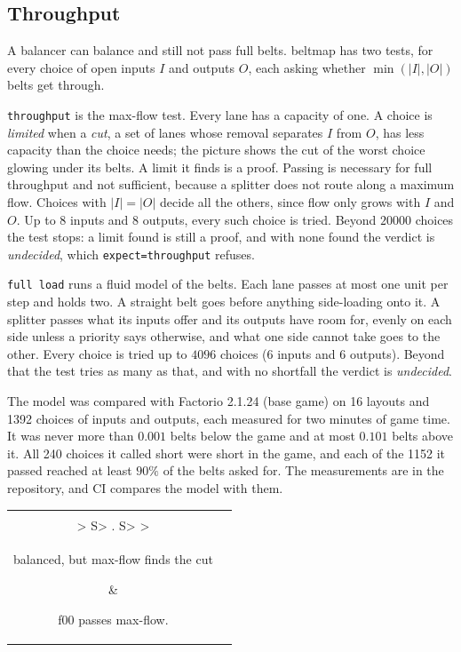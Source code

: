 \documentclass[11pt]{article}
\newcommand\key[1]{\texttt{#1}}
\newenvironment{pictures}[1]{\tagpdfsetup{table/tagging=presentation}\begin{tabular}{#1}}{\end{tabular}}
\begin{document}
	\subsection{Throughput}
	\label{sec:tp}

	A balancer can balance and still not pass full belts. \textsf{beltmap} has two tests, for every choice of open inputs $I$ and outputs $O$, each asking whether $\min(|I|, |O|)$ belts get through.

	\key{throughput} is the max-flow test. Every lane has a capacity of one. A choice is \emph{limited} when a \emph{cut}, a set of lanes whose removal separates $I$ from $O$, has less capacity than the choice needs; the picture shows the cut of the worst choice glowing under its belts. A limit it finds is a proof. Passing is necessary for full throughput and not sufficient, because a splitter does not route along a maximum flow. Choices with $|I| = |O|$ decide all the others, since flow only grows with $I$ and $O$. Up to $8$ inputs and $8$ outputs, every such choice is tried. Beyond $20000$ choices the test stops: a limit found is still a proof, and with none found the verdict is \emph{undecided}, which \key{expect=throughput} refuses.

	\key{full load} runs a fluid model of the belts. Each lane passes at most one unit per step and holds two. A straight belt goes before anything side-loading onto it. A splitter passes what its inputs offer and its outputs have room for, evenly on each side unless a priority says otherwise, and what one side cannot take goes to the other. Every choice is tried up to $4096$ choices ($6$ inputs and $6$ outputs). Beyond that the test tries as many as that, and with no shortfall the verdict is \emph{undecided}.

	The model was compared with Factorio 2.1.24 (base game) on 16 layouts and 1392 choices of inputs and outputs, each measured for two minutes of game time. It was never more than $0.001$ belts below the game and at most $0.101$ belts above it. All 240 choices it called short were short in the game, and each of the 1152 it passed reached at least $90\%$ of the belts asked for. The measurements are in the repository, and CI compares the model with them.

	\begin{center}
		\begin{pictures}{@{}c@{\qquad}c@{}}
			\begin{beltgrid}[mix, throughput, labels, tile=6mm, expect={balanced, limited, full-load-limited}]
				> S> > S> > \\
				> S> . S> >
			\end{beltgrid}
			&
			\beltlayout[full load, labels, tile=3.4mm, expect={throughput, full-load-limited}]{examples/f00_9x10.json} \\[2pt]
			\parbox[t]{0.42\linewidth}{\centering\small balanced, but max-flow finds the cut} &
			\parbox[t]{0.46\linewidth}{\centering\small f00 passes max-flow. \beltmapfullload}
		\end{pictures}
	\end{center}
\end{document}

